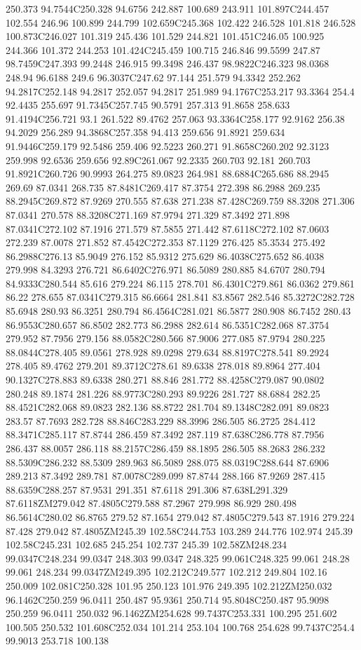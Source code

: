 250.373 94.7544C250.328 94.6756 242.887 100.689 243.911 101.897C244.457 102.554 246.96 100.899 244.799 102.659C245.368 102.422 246.528 101.818 246.528 100.873C246.027 101.319 245.436 101.529 244.821 101.451C246.05 100.925 244.366 101.372 244.253 101.424C245.459 100.715 246.846 99.5599 247.87 98.7459C247.393 99.2448 246.915 99.3498 246.437 98.9822C246.323 98.0368 248.94 96.6188 249.6 96.3037C247.62 97.144 251.579 94.3342 252.262 94.2817C252.148 94.2817 252.057 94.2817 251.989 94.1767C253.217 93.3364 254.4 92.4435 255.697 91.7345C257.745 90.5791 257.313 91.8658 258.633 91.4194C256.721 93.1 261.522 89.4762 257.063 93.3364C258.177 92.9162 256.38 94.2029 256.289 94.3868C257.358 94.413 259.656 91.8921 259.634 91.9446C259.179 92.5486 259.406 92.5223 260.271 91.8658C260.202 92.3123 259.998 92.6536 259.656 92.89C261.067 92.2335 260.703 92.181 260.703 91.8921C260.726 90.9993 264.275 89.0823 264.981 88.6884C265.686 88.2945 269.69 87.0341 268.735 87.8481C269.417 87.3754 272.398 86.2988 269.235 88.2945C269.872 87.9269 270.555 87.638 271.238 87.428C269.759 88.3208 271.306 87.0341 270.578 88.3208C271.169 87.9794 271.329 87.3492 271.898 87.0341C272.102 87.1916 271.579 87.5855 271.442 87.6118C272.102 87.0603 272.239 87.0078 271.852 87.4542C272.353 87.1129 276.425 85.3534 275.492 86.2988C276.13 85.9049 276.152 85.9312 275.629 86.4038C275.652 86.4038 279.998 84.3293 276.721 86.6402C276.971 86.5089 280.885 84.6707 280.794 84.9333C280.544 85.616 279.224 86.115 278.701 86.4301C279.861 86.0362 279.861 86.22 278.655 87.0341C279.315 86.6664 281.841 83.8567 282.546 85.3272C282.728 85.6948 280.93 86.3251 280.794 86.4564C281.021 86.5877 280.908 86.7452 280.43 86.9553C280.657 86.8502 282.773 86.2988 282.614 86.5351C282.068 87.3754 279.952 87.7956 279.156 88.0582C280.566 87.9006 277.085 87.9794 280.225 88.0844C278.405 89.0561 278.928 89.0298 279.634 88.8197C278.541 89.2924 278.405 89.4762 279.201 89.3712C278.61 89.6338 278.018 89.8964 277.404 90.1327C278.883 89.6338 280.271 88.846 281.772 88.4258C279.087 90.0802 280.248 89.1874 281.226 88.9773C280.293 89.9226 281.727 88.6884 282.25 88.4521C282.068 89.0823 282.136 88.8722 281.704 89.1348C282.091 89.0823 283.57 87.7693 282.728 88.846C283.229 88.3996 286.505 86.2725 284.412 88.3471C285.117 87.8744 286.459 87.3492 287.119 87.638C286.778 87.7956 286.437 88.0057 286.118 88.2157C286.459 88.1895 286.505 88.2683 286.232 88.5309C286.232 88.5309 289.963 86.5089 288.075 88.0319C288.644 87.6906 289.213 87.3492 289.781 87.0078C289.099 87.8744 288.166 87.9269 287.415 88.6359C288.257 87.9531 291.351 87.6118 291.306 87.638L291.329 87.6118ZM279.042 87.4805C279.588 87.2967 279.998 86.929 280.498 86.5614C280.02 86.8765 279.52 87.1654 279.042 87.4805C279.543 87.1916 279.224 87.428 279.042 87.4805ZM245.39 102.58C244.753 103.289 244.776 102.974 245.39 102.58C245.231 102.685 245.254 102.737 245.39 102.58ZM248.234 99.0347C248.234 99.0347 248.303 99.0347 248.325 99.061C248.325 99.061 248.28 99.061 248.234 99.0347ZM249.395 102.212C249.577 102.212 249.804 102.16 250.009 102.081C250.328 101.95 250.123 101.976 249.395 102.212ZM250.032 96.1462C250.259 96.0411 250.487 95.9361 250.714 95.8048C250.487 95.9098 250.259 96.0411 250.032 96.1462ZM254.628 99.7437C253.331 100.295 251.602 100.505 250.532 101.608C252.034 101.214 253.104 100.768 254.628 99.7437C254.4 99.9013 253.718 100.138 